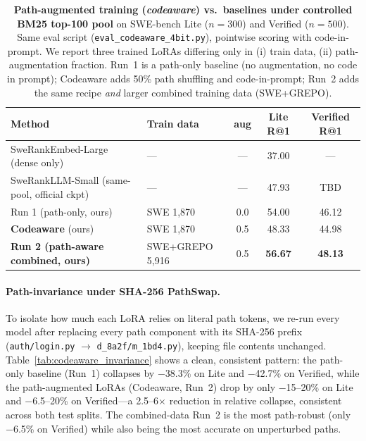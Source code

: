 \documentclass{article}
\begin{document}
\begin{table}[t]
\centering
\caption{\textbf{Path-augmented training (\emph{codeaware}) vs.\ baselines under controlled BM25 top-100 pool} on SWE-bench Lite ($n{=}300$) and Verified ($n{=}500$). Same eval script (\texttt{eval\_codeaware\_4bit.py}), pointwise scoring with code-in-prompt. We report three trained LoRAs differing only in (i) train data, (ii) path-augmentation fraction. Run~1 is a path-only baseline (no augmentation, no code in prompt); Codeaware adds 50\% path shuffling and code-in-prompt; Run~2 adds the same recipe \emph{and} larger combined training data (SWE+GREPO).}
\label{tab:codeaware_main}
\small
\begin{tabular}{llccc}
\toprule
\textbf{Method} & \textbf{Train data} & \textbf{aug} & \textbf{Lite R@1} & \textbf{Verified R@1} \\
\midrule
SweRankEmbed-Large (dense only)             & ---                & --- & 37.00 & --- \\
SweRankLLM-Small (same-pool, official ckpt) & ---                & --- & 47.93 & TBD \\
\midrule
Run 1 (path-only, ours)                     & SWE 1{,}870        & 0.0 & 54.00 & 46.12 \\
\textbf{Codeaware} (ours)                   & SWE 1{,}870        & 0.5 & 48.33 & 44.98 \\
\textbf{Run 2 (path-aware combined, ours)}  & SWE+GREPO 5{,}916  & 0.5 & \textbf{56.67} & \textbf{48.13} \\
\bottomrule
\end{tabular}
\end{table}

\paragraph{Path-invariance under SHA-256 PathSwap.}
To isolate how much each LoRA relies on literal path tokens, we re-run every model after replacing every path component with its SHA-256 prefix (\texttt{auth/login.py} $\rightarrow$ \texttt{d\_8a2f/m\_1bd4.py}), keeping file contents unchanged.
Table~\ref{tab:codeaware_invariance} shows a clean, consistent pattern: the path-only baseline (Run~1) collapses by $-$38.3\% on Lite and $-$42.7\% on Verified, while the path-augmented LoRAs (Codeaware, Run~2) drop by only $-$15--20\% on Lite and $-$6.5--20\% on Verified---a 2.5--6$\times$ reduction in relative collapse, consistent across both test splits.
The combined-data Run~2 is the most path-robust (only $-$6.5\% on Verified) while also being the most accurate on unperturbed paths.
\end{document}
